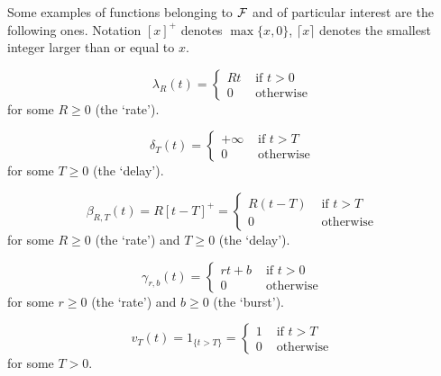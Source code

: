 Some examples of functions belonging to $\mathcal F$ and of particular interest are the
following ones.
Notation $[x]^{+}$ denotes $\max \{x,0 \}$,  $\lceil x \rceil$ denotes the smallest integer larger than or equal to $x$.
\begin{definition}
$$
\lambda_{R}(t)= \left\{ \begin{array}{ll}  Rt & \mbox{ if } t > 0 \\
                        0 & \mbox{ otherwise }
\end{array}
\right.
$$
for some $R \geq 0$ (the `rate').
\end{definition}
\begin{definition}
$$
\delta_{T}(t)= \left\{  \begin{array}{ll}  +\infty & \mbox{ if } t > T \\
                        0 & \mbox{ otherwise }
\end{array}
\right.
$$
for some $T \geq 0$ (the `delay').
\end{definition}
\begin{definition}
$$
\beta_{R,T}(t) = R [t-T]^{+} = \left\{  \begin{array}{ll}  R(t-T) & \mbox{ if } t > T \\
                        0 & \mbox{ otherwise }
\end{array}
\right.
$$
for some $R \geq 0$ (the `rate') and $T \geq 0$ (the `delay').
\end{definition}
\begin{definition}
$$ \gamma_{r,b}(t) = \left\{ \begin{array}{ll} rt + b & \mbox{ if } t > 0 \\
                    0 & \mbox{ otherwise }
\end{array}
\right.
$$
for some $r \geq 0$ (the `rate') and $ b \geq 0$ (the `burst').
\end{definition}
%
%
\begin{definition}
$$ v_{T}(t) = 1_{ \{ t > T \} } = \left\{ \begin{array}{ll} 1 & \mbox{ if } t > T \\
                    0 & \mbox{ otherwise }
\end{array}
\right.
$$
for some $T > 0$.
\end{definition}
